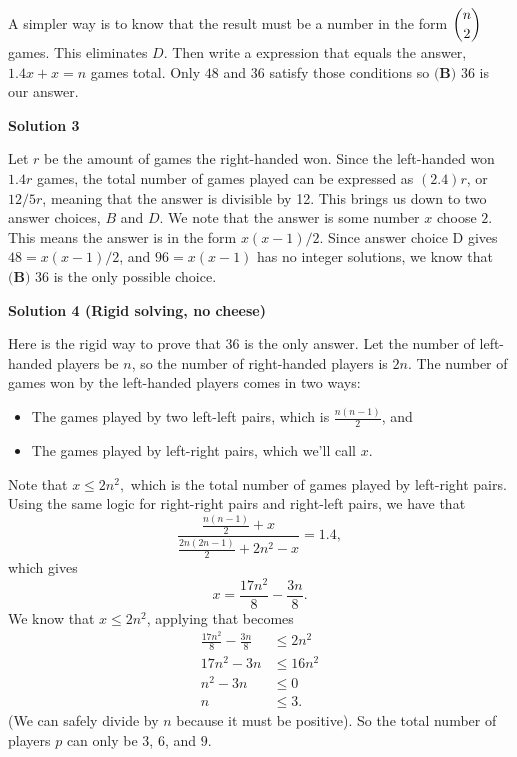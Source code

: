 \begin{enumerate}
 


 A simpler way is to know that the result must be a number in the form $\dbinom{n}{2}$ games. This eliminates $D$. Then write a expression that equals the answer, $1.4x + x = n$ games total. Only $48$ and $36$ satisfy those conditions so $\boxed{\textbf{(B) }36}$ is our answer.

 



\textbf{Solution 3}

Let $r$ be the amount of games the right-handed won. Since the left-handed won $1.4r$ games, the total number of games played can be expressed as $(2.4)r$, or $12/5r$, meaning that the answer is divisible by 12. This brings us down to two answer choices, $B$ and $D$. We note that the answer is some number $x$ choose $2$. This means the answer is in the form $x(x-1)/2$. Since answer choice D gives $48 = x(x-1)/2$, and $96 = x(x-1)$ has no integer solutions, we know that $\boxed{\textbf{(B) }36}$ is the only possible choice.

 



\textbf{Solution 4 (Rigid solving, no cheese)}

Here is the rigid way to prove that $36$ is the only answer. Let the number of left-handed players be $n$, so the number of right-handed players is $2n$. The number of games won by the left-handed players comes in two ways: 

 
            \begin{itemize}
        \item The games played by two left-left pairs, which is $\frac{n(n-1)}{2}$, and
        \item The games played by left-right pairs, which we'll call $x$.
            \end{itemize}
            Note that $x\leq 2n^2,$ which is the total number of games played by left-right pairs. Using the same logic for right-right pairs and right-left pairs, we have that 
 \[\frac{\frac{n(n-1)}{2}+x}{\frac{2n(2n-1)}{2}+2n^2-x}=1.4,\] which gives 
 \[x=\frac{17n^2}{8}-\frac{3n}{8}.\] We know that $x\leq 2n^2$, applying that becomes
 \begin{align*} \frac{17n^2}{8}-\frac{3n}{8} &\le 2n^2 \\ 17n^2 - 3n &\le 16n^2 \\ n^2 - 3n &\le 0 \\ n &\le 3. \end{align*}
(We can safely divide by $n$ because it must be positive). So the total number of players $p$ can only be $3$, $6$, and $9$. 


\end{enumerate}
